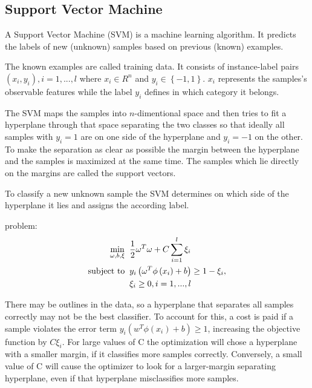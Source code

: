 
\subsection{Support Vector Machine}
A Support Vector Machine (SVM) is a machine learning algorithm. It predicts the labels of new (unknown) samples based on previous (known) examples. 

The known examples are called training data. It consists of instance-label pairs \(\left ( x_{i}, y_{i} \right ), i=1,...,l\) where \(x_{i}\in R^{n}\) and \(y_{i}\in \left \{ -1,1 \right \}\). \(x_{i}\) represents the samples's observable features while the label \(y_{i}\) defines in which category it belongs.

The SVM maps the samples into \(n\)-dimentional space and then tries to fit a hyperplane through that space separating the two classes so that ideally all samples with \(y_{i}=1\) are on one side of the hyperplane and \(y_{i}=-1\) on the other. To make the separation as clear as possible the margin between the hyperplane and the samples is maximized at the same time. The samples which lie directly on the margins are called the support vectors.

To classify a new unknown sample the SVM determines on which side of the hyperplane it lies and assigns the according label.

 problem\cite{chang2011libsvm}:
\begin{equation}
\begin{split}
\min_{\omega , b ,\xi}\;\; & \frac{1}{2}\omega^{T}\omega +C\sum_{i=1}^{l}\xi_{i}\\
\textup{subject to}\;\; & y_{i}\left ( \omega^{T}\phi \left ( x_{i} \right )+b \right )\geq 1-\xi_{i},\\
& \xi_{i}\geq 0,i=1,...,l
\end{split}
\end{equation}

There may be outlines in the data, so a hyperplane that separates all samples correctly may not be the best classifier. To account for this, a cost is paid if a sample violates the error term \(y_{i}\left ( w^{T}\phi \left ( x_{i} \right )+b \right )\geq 1\), increasing the objective function by \(C \xi_{i}\). For large values of C the optimization will chose a hyperplane with a smaller margin, if it classifies more samples correctly. Conversely, a small value of C will cause the optimizer to look for a larger-margin separating hyperplane, even if that hyperplane misclassifies more samples\cite{crossValidatedSVMC}.

